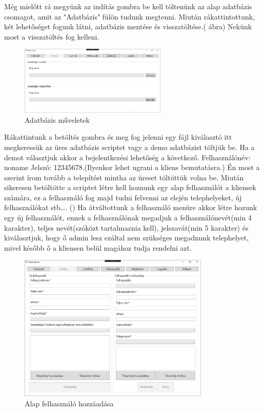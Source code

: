 \documentclass[
]{thesis-ekf}
\theoremstyle{definition}
\theoremstyle{remark}
\begin{document}
Még mielőtt rá megyünk az indítás gombra be kell töltenünk az alap adatbázis csomagot, amit az "Adatbázis" fülön tudunk megtenni. Miután rákattintottunk, két lehetőséget fogunk látni, adatbázis mentése és visszatöltése.(\Az{\ref{fig:sadat}} ábra) Nekünk most a visszatöltés fog kelleni.
\begin{figure}[h!]
	\centering
	\includegraphics[width=7cm]{dokukepek/sadat}
	\caption{Adatbázis műveletek}
	\label{fig:sadat}
\end{figure}
Rákattintunk a betöltés gombra és meg fog jelenni egy fájl kiválasztó itt megkeressük az üres adatbázis scriptet vagy a demo adatbázist töltjük be. Ha a demot választjuk akkor a bejelentkezési lehetőség a következő. Felhasználónév: noname Jelszó: 12345678.(Ilyenkor lehet ugrani a kliens bemutatásra.) Én most a szerint írom tovább a telepítést mintha az üreset töltöttük volna be. Miután sikeresen betöltötte a scriptet létre kell hoznunk egy alap felhasználót a kliensek számára, ez a felhasználó fog majd tudni felvenni az elején telephelyeket, új felhasználókat stb\dots. () Ha átváltottunk a felhasználó menüre akkor létre hozunk egy új felhasználót, ennek a felhasználónak megadjuk a felhasználónevét(min 4 karakter), teljes nevét(szóközt tartalmaznia kell), jelszavát(min 5 karakter) és kiválasztjuk, hogy ő admin lesz ezáltal nem szükséges megadnunk telephelyet, mivel később ő a kliensen belül magához tudja rendelni azt.
\begin{figure}[!h]
	\centering
	\includegraphics[height=7cm]{dokukepek/sfelh}
	\caption{Alap felhasználó hozzáadása}
	\label{fig:sfelh}
\end{figure}
\end{document}
